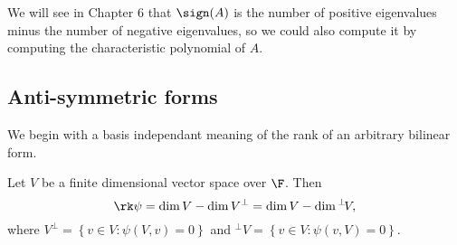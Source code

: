 \vspace{6pt}

\begin{remark}
	We will see in Chapter 6 that $\sign(A)$ is the number of positive eigenvalues minus the number of negative eigenvalues, so we could also compute it by computing the characteristic polynomial of $A$. %
\end{remark}


	\pagebreak

\subsection{Anti-symmetric forms} %
\label{sub:antisymmetric_forms}

We begin with a basis independant meaning of the rank of an arbitrary bilinear form.
\begin{proposition}
	Let $V$ be a finite dimensional vector space over $\F$. Then
	\begin{equation*}
		\rk\psi = \dim V - \dim V^\perp = \dim V - \dim {}^\perp\! V,
	\end{equation*}
	where $V^\perp = \left\{v\in V: \psi(V,v) = 0 \right\}$ and ${}^\perp V = \left\{v\in V:\psi(v,V) = 0\right\}$. %
\end{proposition}

